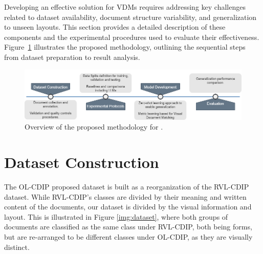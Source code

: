Developing an effective solution for \glspl{VDM} requires addressing key challenges related to dataset availability, document structure variability, and generalization to unseen layouts. This section provides a detailed description of these components and the experimental procedures used to evaluate their effectiveness. Figure~\ref{fig1} illustrates the proposed methodology, outlining the sequential steps from dataset preparation to result analysis.



\begin{figure}[htbp]
\centering
\includegraphics[width=\textwidth, trim={0em 0em 0em 0em},clip]{images/Pipeline Pesquisa 1.png}
\caption{Overview of the proposed  methodology for .\label{fig1}}
\end{figure}  

\section{Dataset Construction}
\label{sec:method_dataset}

The OL-CDIP proposed dataset is built as a reorganization of the RVL-CDIP \cite{harley2015rvlcdip} dataset. While RVL-CDIP's classes are divided by their meaning and written content of the documents, our dataset is divided by the visual information and layout. This is illustrated in Figure \ref{img:dataset}, where both groups of documents are classified as the same class under RVL-CDIP, both being forms, but are re-arranged to be different classes under OL-CDIP, as they are visually distinct. 

